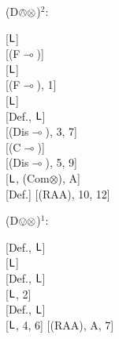 \documentclass[a4paper,english,fleqn,11pt,final]{scrartcl}
\newcommand{\negg}{{\sim}}
\newcommand{\sfL}{\protect\ensuremath{\mathsf{L}}}
\newcommand{\limp}{\multimap}
\newcommand{\timp}{\rightarrowtriangle}
\newcommand{\tens}{\otimes}
\newcommand{\Deriv}[1]{{\normalfont\textsf{#1}}}
\newcommand{\oland}{\owedge}
\theoremstyle{plain}
\theoremstyle{definition}
\begin{document}
{\begin{minipage}[t][][b]{.46\textwidth}
\Deriv{(D$\oland\tens$)$^2$}:

\medskip

{
\setlength{\fitchprfwidth}{1.63in}
\fitchprf{
\pline[A ]{\alpha \oland (\varphi \tens \psi)}
}
{
	\pline[1 ]{\alpha}[$\sfL$]\\
	\pline[2 ]{(\alpha \oland \varphi) \limp \alpha}[\Deriv{(F$\limp$)}]\\
	\pline[3 ]{(\alpha \oland \varphi) \limp (\negg(\alpha \oland \psi) \timp \negg \psi) }[$\sfL$]\\
	\pline[4 ]{\psi \limp \alpha}[\Deriv{(F$\limp$)}, 1]\\
	\pline[5 ]{\psi \limp(\negg(\alpha \oland \varphi) \timp \negg \varphi) }[$\sfL$]\\
	\subproof{\pline[6 ]{\negg ((\alpha \oland \varphi) \tens (\alpha \oland \psi))}}
	{
		\pline[7 ]{(\alpha \oland \varphi) \limp \negg(\alpha \oland \psi)}[Def., $\sfL$]\\
		\pline[8 ]{(\alpha \oland \varphi) \limp \negg \psi}[\Deriv{(Dis$\limp$)}, 3, 7]\\
		\pline[9 ]{\psi \limp \negg(\alpha \oland \varphi)}[\Deriv{(C$\limp$)}]\\
		\pline[10]{\psi \limp \negg \varphi}[\Deriv{(Dis$\limp$)}, 5, 9]\\
		\pline[11]{\psi \tens \varphi}[$\sfL$, \Deriv{(Com$\tens$)}, A]\\
		\pline[12]{\negg(\psi \limp \negg\varphi)}[Def.]
	}
	\pline[\slider]{(\alpha \oland \varphi) \tens (\alpha \oland \psi)}[\Deriv{(RAA)}, 10, 12]
}
}
\end{minipage}


\bigskip


\begin{minipage}[t][][b]{.43\textwidth}

\Deriv{(D$\ovee\tens$)$^1$}:

\medskip

{
\setlength{\fitchprfwidth}{1.15in}
\fitchprf{
\pline[A ]{(\varphi \tens \psi) \ovee (\varphi \tens \vartheta)}
}
{
\subproof{\pline[1 ]{\negg (\varphi \tens (\psi \ovee \vartheta))}}
{
	\pline[2 ]{\varphi \limp \negg(\psi \ovee \vartheta)}[Def., $\sfL$]\\
	\pline[3 ]{\varphi \limp \negg \psi}[$\sfL$]\\
	\pline[4 ]{\negg(\varphi \tens \psi)}[Def., $\sfL$]\\
	\pline[5 ]{\varphi \limp \negg \vartheta}[$\sfL$, 2]\\
	\pline[6 ]{\negg(\varphi \tens \vartheta)}[Def., $\sfL$]\\
	\pline[7 ]{\hspace{-6pt}\brokenform{\negg((\varphi \tens \psi)}
	{\formula{\ovee(\varphi \tens \vartheta))}} \hspace{-10pt} }[$\sfL$, 4, 6]
}
	\pline[\slider]{\varphi \tens (\psi \ovee \vartheta)}[\Deriv{(RAA)}, A, 7]
}
}
\end{minipage}
\begin{minipage}[t][][b]{.46\textwidth}


\end{minipage}}
\end{document}
